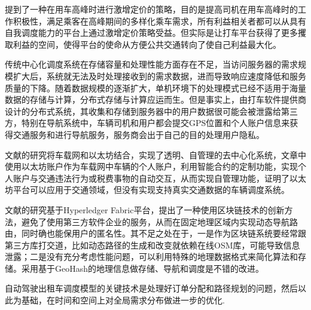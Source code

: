 提到了一种在用车高峰时进行激增定价的策略，目的是提高司机在用车高峰时的工作积极性，满足乘客在高峰期间的多样化乘车需求，所有利益相关者都可以从具有自我调度能力的平台上通过激增定价策略受益。但实际是让打车平台获得了更多攫取利益的空间，使得平台的使命从方便公共交通转向了使自己利益最大化。\par

传统中心化调度系统在存储容量和处理性能方面存在不足，当访问服务器的需求规模扩大后，系统就无法及时处理接收到的需求数据，进而导致响应速度降低和服务质量的下降。随着数据规模的逐渐扩大，单机环境下的处理模式已经不适用于海量数据的存储与计算，分布式存储与计算应运而生。但是事实上，由打车软件提供商设计的分布式系统，其收集和存储到服务器中的用户数据很可能会被泄露给第三方，特别在导航系统中，车辆司机和用户都会提交GPS位置和个人账户信息来获得交通服务和进行导航服务，服务商会出于自己的目的处理用户隐私。\par

文献的研究将车载网和以太坊结合，实现了透明、自管理的去中心化系统，文章中使用以太坊账户作为车载网中车辆的个人账户，利用智能合约的定制功能，实现个人账户与交通违法行为或税费事物的自动交互，从而实现自管理功能，证明了以太坊平台可以应用于交通领域，但没有实现支持真实交通数据的车辆调度系统。\par

文献的研究基于Hyperledger Fabric平台，提出了一种使用区块链技术的创新方法，避免了使用第三方软件企业的服务，从而在固定地理区域内实现动态导航路由，同时确也能保用户的匿名性。其不足之处在于，一是作为区块链系统要经常跟第三方库打交道，比如动态路径的生成和改变就依赖在线OSM库，可能导致信息泄露；二是没有充分考虑性能问题，可以利用特殊的地理数据格式来简化算法和存储。采用基于GeoHash的地理信息做存储、导航和调度是不错的改进。

自动驾驶出租车调度模型的关键技术是处理好订单分配和路径规划的问题，然后以此为基础，在时间和空间上对全局需求分布做进一步的优化.

